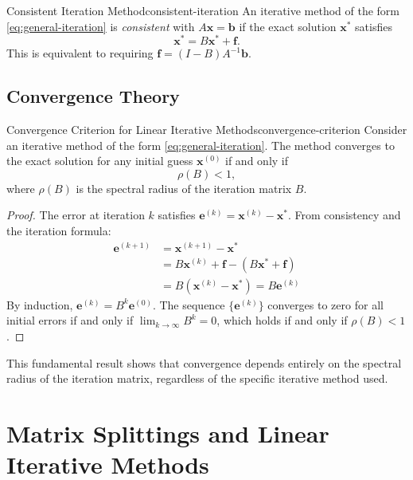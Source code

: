 \begin{definition}{Consistent Iteration Method}{consistent-iteration}
    An iterative method of the form \eqref{eq:general-iteration} is \emph{consistent} with $A\mathbf{x} = \mathbf{b}$ if the exact solution $\mathbf{x}^*$ satisfies
    \begin{equation}
        \mathbf{x}^* = B\mathbf{x}^* + \mathbf{f}.
    \end{equation}
    This is equivalent to requiring $\mathbf{f} = (I - B)A^{-1}\mathbf{b}$.
\end{definition}

\subsection{Convergence Theory}

\begin{theorem}{Convergence Criterion for Linear Iterative Methods}{convergence-criterion}
    Consider an iterative method of the form \eqref{eq:general-iteration}. The method converges to the exact solution for any initial guess $\mathbf{x}^{(0)}$ if and only if
    \begin{equation}
        \rho(B) < 1,
    \end{equation}
    where $\rho(B)$ is the spectral radius of the iteration matrix $B$.
\end{theorem}

\begin{proof}
    The error at iteration $k$ satisfies $\mathbf{e}^{(k)} = \mathbf{x}^{(k)} - \mathbf{x}^*$. From consistency and the iteration formula:
    \begin{align}
        \mathbf{e}^{(k+1)} &= \mathbf{x}^{(k+1)} - \mathbf{x}^* \\
        &= B\mathbf{x}^{(k)} + \mathbf{f} - (B\mathbf{x}^* + \mathbf{f}) \\
        &= B(\mathbf{x}^{(k)} - \mathbf{x}^*) = B\mathbf{e}^{(k)}
    \end{align}
    By induction, $\mathbf{e}^{(k)} = B^k \mathbf{e}^{(0)}$. The sequence $\{\mathbf{e}^{(k)}\}$ converges to zero for all initial errors if and only if $\lim_{k\to\infty} B^k = 0$, which holds if and only if $\rho(B) < 1$.
\end{proof}

This fundamental result shows that convergence depends entirely on the spectral radius of the iteration matrix, regardless of the specific iterative method used.

\section{Matrix Splittings and Linear Iterative Methods}


